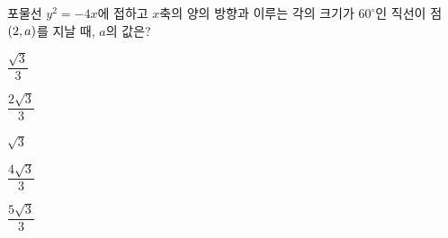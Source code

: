 포물선 $y^2=-4x$에 접하고 $x$축의 양의 방향과 이루는 각의 크기가 $60^\circ$인 직선이 점 $(2{,}\mkern3mu\mathopen{}a)$를 지날 때, $a$의 값은?
\begin{choices32}{\rule[-3ex]{0pt}{8ex}$\dfrac{\sqrt{3}}{3}$}{\rule[-3ex]{0pt}{8ex}$\dfrac{2\sqrt{3}}{3}$}{\rule[-3ex]{0pt}{8ex}$\sqrt{3}$}{\rule[-3ex]{0pt}{8ex}$\dfrac{4\sqrt{3}}{3}$}{\rule[-3ex]{0pt}{8ex}$\dfrac{5\sqrt{3}}{3}$}\end{choices32}
